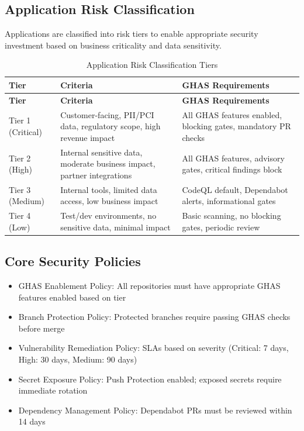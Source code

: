 \documentclass[11pt]{article}
\begin{document}
\subsection{Application Risk Classification}

Applications are classified into risk tiers to enable appropriate security investment based on business criticality and data sensitivity.

\begin{longtable}{@{}>{\RaggedRight\arraybackslash}p{}>{\RaggedRight\arraybackslash}p{}>{\RaggedRight\arraybackslash}p{}@{}}
\caption{Application Risk Classification Tiers}\label{tab:risk_tiers}\\
\toprule
\textbf{Tier} & \textbf{Criteria} & \textbf{GHAS Requirements} \\
\midrule
\endfirsthead
\toprule
\textbf{Tier} & \textbf{Criteria} & \textbf{GHAS Requirements} \\
\midrule
\endhead
\bottomrule
\endfoot
Tier 1 (Critical) & Customer-facing, PII/PCI data, regulatory scope, high revenue impact & All GHAS features enabled, blocking gates, mandatory PR checks \\
Tier 2 (High) & Internal sensitive data, moderate business impact, partner integrations & All GHAS features, advisory gates, critical findings block \\
Tier 3 (Medium) & Internal tools, limited data access, low business impact & CodeQL default, Dependabot alerts, informational gates \\
Tier 4 (Low) & Test/dev environments, no sensitive data, minimal impact & Basic scanning, no blocking gates, periodic review \\
\end{longtable}

\subsection{Core Security Policies}

\begin{itemize}[leftmargin=*]
\item GHAS Enablement Policy: All repositories must have appropriate GHAS features enabled based on tier
\item Branch Protection Policy: Protected branches require passing GHAS checks before merge
\item Vulnerability Remediation Policy: SLAs based on severity (Critical: 7 days, High: 30 days, Medium: 90 days)
\item Secret Exposure Policy: Push Protection enabled; exposed secrets require immediate rotation
\item Dependency Management Policy: Dependabot PRs must be reviewed within 14 days
\end{itemize}
\end{document}
